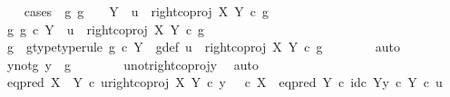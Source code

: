 \begin{isabellebody}
\ \ \isamarkupfalse%
\ {\isacharparenleft}{\kern0pt}cases\ {\isachardoublequoteopen}{\isasymexists}\ g{\isachardot}{\kern0pt}\ g\ {\isacharcolon}{\kern0pt}\ {\isasymone}\ {\isasymrightarrow}\ Y\ {\isasymand}\ u\ {\isacharequal}{\kern0pt}\ right{\isacharunderscore}{\kern0pt}coproj\ X\ Y\ {\isasymcirc}\isactrlsub c\ g{\isachardoublequoteclose}{\isacharparenright}{\kern0pt}\isanewline
\ \ \ \ \isamarkupfalse%
\ {\isachardoublequoteopen}{\isasymexists}g{\isachardot}{\kern0pt}\ g\ {\isasymin}\isactrlsub c\ Y\ {\isasymand}\ u\ {\isacharequal}{\kern0pt}\ right{\isacharunderscore}{\kern0pt}coproj\ X\ Y\ {\isasymcirc}\isactrlsub c\ g{\isachardoublequoteclose}\isanewline
\ \ \ \ \isamarkupfalse%
\ \isamarkupfalse%
\ g\ \ g{\isacharunderscore}{\kern0pt}type{\isacharbrackleft}{\kern0pt}type{\isacharunderscore}{\kern0pt}rule{\isacharbrackright}{\kern0pt}{\isacharcolon}{\kern0pt}\ {\isachardoublequoteopen}g\ {\isasymin}\isactrlsub c\ Y{\isachardoublequoteclose}\ \ g{\isacharunderscore}{\kern0pt}def{\isacharcolon}{\kern0pt}\ {\isachardoublequoteopen}u\ {\isacharequal}{\kern0pt}\ right{\isacharunderscore}{\kern0pt}coproj\ X\ Y\ {\isasymcirc}\isactrlsub c\ g{\isachardoublequoteclose}\isanewline
\ \ \ \ \ \ \isamarkupfalse%
\ auto\isanewline
\ \ \ \ \isamarkupfalse%
\ \isamarkupfalse%
\ y{\isacharunderscore}{\kern0pt}not{\isacharunderscore}{\kern0pt}g{\isacharcolon}{\kern0pt}\ {\isachardoublequoteopen}y\ {\isasymnoteq}\ g{\isachardoublequoteclose}\isanewline
\ \ \ \ \ \ \isamarkupfalse%
\ u{\isacharunderscore}{\kern0pt}not{\isacharunderscore}{\kern0pt}right{\isacharunderscore}{\kern0pt}coproj{\isacharunderscore}{\kern0pt}y\ \isamarkupfalse%
\ auto\isanewline
\isanewline
\ \ \ \ \isamarkupfalse%
\ {\isachardoublequoteopen}eq{\isacharunderscore}{\kern0pt}pred\ {\isacharparenleft}{\kern0pt}X\ {\isasymCoprod}\ Y{\isacharparenright}{\kern0pt}\ {\isasymcirc}\isactrlsub c\ {\isasymlangle}u{\isacharcomma}{\kern0pt}right{\isacharunderscore}{\kern0pt}coproj\ X\ Y\ {\isasymcirc}\isactrlsub c\ y{\isasymrangle}\ {\isacharequal}{\kern0pt}\ {\isacharparenleft}{\kern0pt}{\isasymf}\ {\isasymcirc}\isactrlsub c\ {\isasymbeta}\isactrlbsub X\isactrlesub {\isacharparenright}{\kern0pt}\ {\isasymamalg}\ {\isacharparenleft}{\kern0pt}eq{\isacharunderscore}{\kern0pt}pred\ Y\ {\isasymcirc}\isactrlsub c\ {\isasymlangle}id\isactrlsub c\ Y{\isacharcomma}{\kern0pt}y\ {\isasymcirc}\isactrlsub c\ {\isasymbeta}\isactrlbsub Y\isactrlesub {\isasymrangle}{\isacharparenright}{\kern0pt}\ {\isasymcirc}\isactrlsub c\ u{\isachardoublequoteclose}\isanewline

\end{isabellebody}
